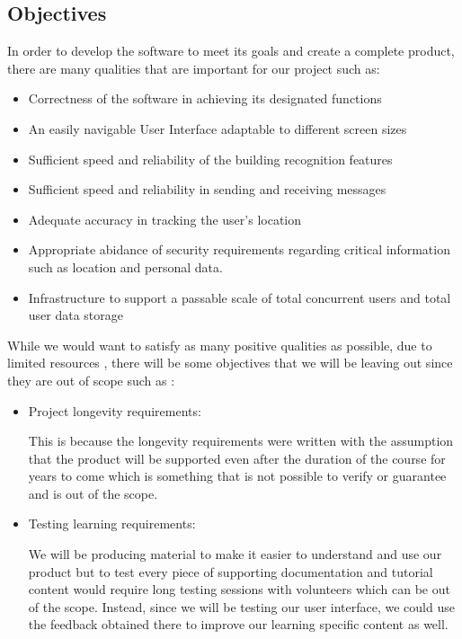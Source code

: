 \documentclass[12pt, titlepage]{article}
\begin{document}
 

\subsection{Objectives}

In order to develop the software to meet its goals and create a complete product, there are many qualities that are important for our project such as:

\begin{itemize}

    \item  Correctness of the software in achieving its designated functions

    \item An easily navigable User Interface adaptable to different screen sizes

    \item Sufficient speed and reliability of the building recognition features

    \item Sufficient speed and reliability in sending and receiving messages

    \item Adequate accuracy in tracking the user's location

    \item Appropriate abidance of security requirements regarding critical information such as location and personal data.

    \item Infrastructure to support a passable scale of total concurrent users and total user data storage

    \end{itemize}



While we would want to satisfy as many positive qualities as possible, due to limited resources , there will be some objectives that we will be leaving out since they are out of scope such as :

\begin{itemize}
    \item  Project longevity requirements:

    This is because the longevity requirements were written with the assumption that the product will be supported even after the duration of the course for years to come which is something that is not possible to verify or guarantee and is out of the scope.

    \item  Testing learning requirements:

    We will be producing material to make it easier to understand and use our product but to test every piece of supporting documentation and tutorial content would require long testing sessions with volunteers which can be out of the scope. Instead, since we will be testing our user interface, we could use the feedback obtained there to improve our learning specific content as well.
    
\end{itemize}
\end{document}
